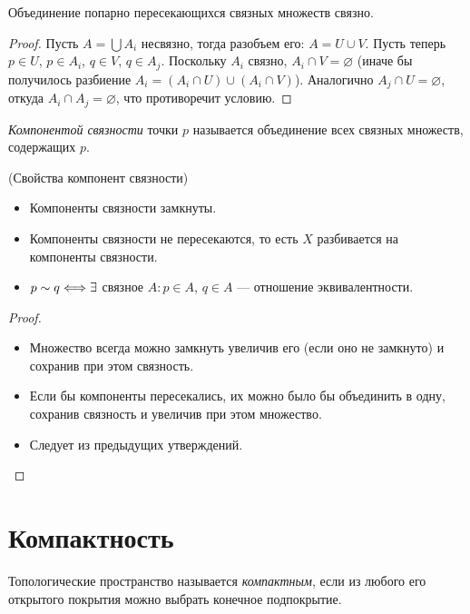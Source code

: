 \begin{theorem}
	Объединение попарно пересекающихся связных множеств связно.
\end{theorem}
\begin{proof}
	Пусть $A = \bigcup{A_i}$ несвязно, тогда разобъем его: $A = U \cup V$.
	Пусть теперь $p \in U$, $p \in A_i$, $q \in V$, $q \in A_j$. Поскольку
	$A_i$ связно, $A_i \cap V = \varnothing$ (иначе бы получилось разбиение
	$A_i = (A_i \cap U) \cup (A_i \cap V)$). Аналогично $A_j \cap U = \varnothing$,
	откуда $A_i \cap A_j = \varnothing$, что противоречит условию.
\end{proof}

\begin{definition}
	\textit{Компонентой связности} точки $p$ называется объединение всех
	связных множеств, содержащих $p$.
\end{definition}

\begin{lemma}(Свойства компонент связности)
	\enewline
	\begin{itemize}
		\item Компоненты связности замкнуты.
		\item Компоненты связности не пересекаются, то есть $X$ разбивается на
			компоненты связности.
		\item $p \sim q \Longleftrightarrow \exists$ связное $A \colon p \in A$, $q \in A$
			--- отношение эквивалентности.
	\end{itemize}
\end{lemma}
\begin{proof}
	\enewline
	\begin{itemize}
		\item Множество всегда можно замкнуть увеличив его (если оно не замкнуто) и
			сохранив при этом связность.
		\item Если бы компоненты пересекались, их можно было бы объединить в одну,
			сохранив связность и увеличив при этом множество.
		\item Следует из предыдущих утверждений.
	\end{itemize}
\end{proof}

\section{Компактность}

\begin{definition}
	Топологические пространство называется \textit{компактным}, если из любого его
	открытого покрытия можно выбрать конечное подпокрытие.
\end{definition}

